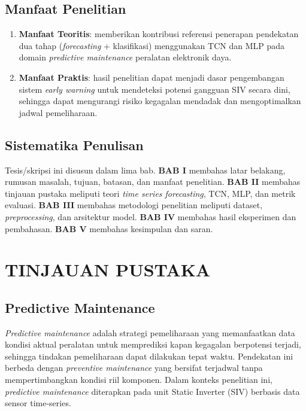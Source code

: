 \documentclass[12pt,a4paper]{report}
\begin{document}
\section{Manfaat Penelitian}
\begin{enumerate}
    \item \textbf{Manfaat Teoritis}: memberikan kontribusi referensi penerapan pendekatan dua tahap (\textit{forecasting} + klasifikasi) menggunakan TCN dan MLP pada domain \textit{predictive maintenance} peralatan elektronik daya.
    \item \textbf{Manfaat Praktis}: hasil penelitian dapat menjadi dasar pengembangan sistem \textit{early warning} untuk mendeteksi potensi gangguan SIV secara dini, sehingga dapat mengurangi risiko kegagalan mendadak dan mengoptimalkan jadwal pemeliharaan.
\end{enumerate}

\section{Sistematika Penulisan}
Tesis/skripsi ini disusun dalam lima bab. \textbf{BAB I} membahas latar belakang, rumusan masalah, tujuan, batasan, dan manfaat penelitian. \textbf{BAB II} membahas tinjauan pustaka meliputi teori \textit{time series forecasting}, TCN, MLP, dan metrik evaluasi. \textbf{BAB III} membahas metodologi penelitian meliputi dataset, \textit{preprocessing}, dan arsitektur model. \textbf{BAB IV} membahas hasil eksperimen dan pembahasan. \textbf{BAB V} membahas kesimpulan dan saran.

\newpage
\chapter{TINJAUAN PUSTAKA}

\section{Predictive Maintenance}
\textit{Predictive maintenance} adalah strategi pemeliharaan yang memanfaatkan data kondisi aktual peralatan untuk memprediksi kapan kegagalan berpotensi terjadi, sehingga tindakan pemeliharaan dapat dilakukan tepat waktu. Pendekatan ini berbeda dengan \textit{preventive maintenance} yang bersifat terjadwal tanpa mempertimbangkan kondisi riil komponen. Dalam konteks penelitian ini, \textit{predictive maintenance} diterapkan pada unit Static Inverter (SIV) berbasis data sensor time-series.
\end{document}
